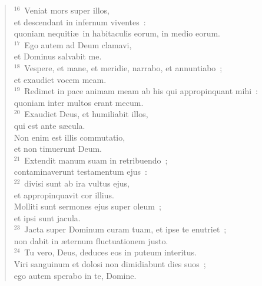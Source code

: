 \begin{verse}
${}^{16}$~Veniat mors super illos,\\ et descendant in infernum viventes~:\\ quoniam nequiti\ae\ in habitaculis eorum, in medio eorum.\\
${}^{17}$~Ego autem ad Deum clamavi,\\ et Dominus salvabit me.\\
${}^{18}$~Vespere, et mane, et meridie, narrabo, et annuntiabo~;\\ et exaudiet vocem meam.\\
${}^{19}$~Redimet in pace animam meam ab his qui appropinquant mihi~:\\ quoniam inter multos erant mecum.\\
${}^{20}$~Exaudiet Deus, et humiliabit illos,\\ qui est ante s\ae cula.\\ Non enim est illis commutatio,\\ et non timuerunt Deum.\\
${}^{21}$~Extendit manum suam in retribuendo~;\\ contaminaverunt testamentum ejus~:\\
${}^{22}$~divisi sunt ab ira vultus ejus,\\ et appropinquavit cor illius.\\ Molliti sunt sermones ejus super oleum~;\\ et ipsi sunt jacula.\\
${}^{23}$~Jacta super Dominum curam tuam, et ipse te enutriet~;\\ non dabit in \ae ternum fluctuationem justo.\\
${}^{24}$~Tu vero, Deus, deduces eos in puteum interitus.\\ Viri sanguinum et dolosi non dimidiabunt dies suos~;\\ ego autem sperabo in te, Domine.\end{verse}



